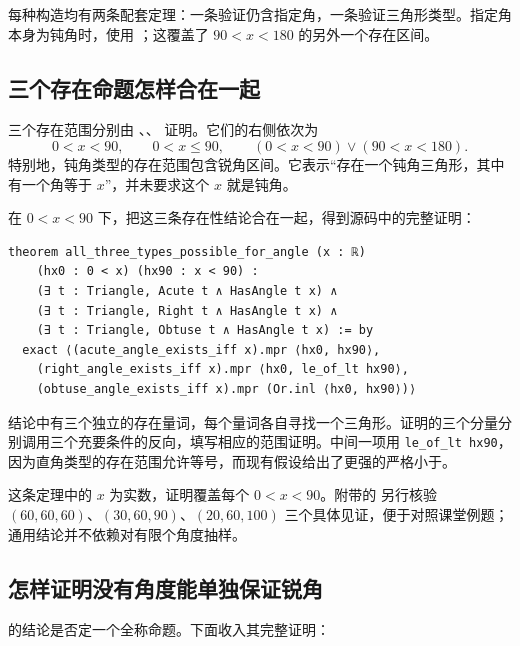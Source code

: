 \documentclass[UTF8,a4paper,zihao=-4,oneside,openany,fontset=fandol]{ctexbook}
\theoremstyle{definition}
\theoremstyle{remark}
\begin{document}
每种构造均有两条配套定理：一条验证仍含指定角，一条验证三角形类型。指定角本身为钝角时，使用 ；这覆盖了 $90<x<180$ 的另外一个存在区间。

\subsection{三个存在命题怎样合在一起}

三个存在范围分别由 、、 证明。它们的右侧依次为
\[
0<x<90,\qquad 0<x\le90,\qquad
(0<x<90)\lor(90<x<180).
\]
特别地，钝角类型的存在范围包含锐角区间。它表示“存在一个钝角三角形，其中有一个角等于 $x$”，并未要求这个 $x$ 就是钝角。

在 $0<x<90$ 下，把这三条存在性结论合在一起，得到源码中的完整证明：

\par\noindent\begin{minipage}{\linewidth}
\begin{Verbatim}[fontsize=\small]
theorem all_three_types_possible_for_angle (x : ℝ)
    (hx0 : 0 < x) (hx90 : x < 90) :
    (∃ t : Triangle, Acute t ∧ HasAngle t x) ∧
    (∃ t : Triangle, Right t ∧ HasAngle t x) ∧
    (∃ t : Triangle, Obtuse t ∧ HasAngle t x) := by
  exact ⟨(acute_angle_exists_iff x).mpr ⟨hx0, hx90⟩,
    (right_angle_exists_iff x).mpr ⟨hx0, le_of_lt hx90⟩,
    (obtuse_angle_exists_iff x).mpr (Or.inl ⟨hx0, hx90⟩)⟩
\end{Verbatim}
\end{minipage}\par

结论中有三个独立的存在量词，每个量词各自寻找一个三角形。证明的三个分量分别调用三个充要条件的反向，填写相应的范围证明。中间一项用 \texttt{le\_of\_lt hx90}，因为直角类型的存在范围允许等号，而现有假设给出了更强的严格小于。

这条定理中的 $x$ 为实数，证明覆盖每个 $0<x<90$。附带的  另行核验 $(60,60,60)$、$(30,60,90)$、$(20,60,100)$ 三个具体见证，便于对照课堂例题；通用结论并不依赖对有限个角度抽样。

\subsection{怎样证明没有角度能单独保证锐角}

 的结论是否定一个全称命题。下面收入其完整证明：
\end{document}
